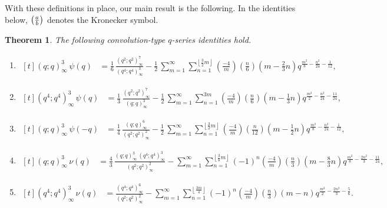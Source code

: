 \documentclass[11pt,reqno]{amsart}
\newtheorem{lthm}{Theorem}
\renewcommand{\=}{\;=\;}
\theoremstyle{myremark}
\begin{document}
With these definitions in place, our main result is the following. 
In the identities below, $\left({a \over b}\right)$ denotes the Kronecker symbol.
\begin{lthm}
\label{thm: main}
The following convolution-type $q$-series identities hold.
\begin{enumerate}[label=\alph*., ref=\alph*, itemsep=1em]
\renewcommand{\labelenumi}{\textup{\alph{enumi}.}}
\item $\displaystyle
\begin{aligned}[t]
(q;q)_\infty^3\,\psi(q)
&=
\frac{1}{6}\,
\frac{(q^2;q^2)_\infty^7}
{(q^4;q^4)_\infty^3} - \frac{1}{2}\,
\sum_{m=1}^\infty
\sum_{n=1}^{\left\lfloor \frac{3}{2}m \right\rfloor}
\left(\frac{-4}{m}\right)
\left(\frac{n}{6}\right)
\left(m-\frac{2}{3}n\right)
q^{\frac{m^2}{8}-\frac{n^2}{24}-\frac{1}{12}},\label{eqn:psi2}
\end{aligned}
$

\item $\displaystyle
\begin{aligned}[t]
(q^4;q^4)_\infty^3\,\psi(q)
&=
\frac{1}{3}\,
\frac{(q^2;q^2)_\infty^7}
{(q;q)_\infty^3}
-\frac{1}{2}\,
\sum_{m=1}^\infty\sum_{n=1}^{3m}\left(\frac{-4}{m}\right)\left(\frac{n}{6}\right)\left(m-\frac{1}{3}n\right)q^{\frac{m^2}{2}-\frac{n^2}{24}-\frac{11}{24}},\label{eqn:psi3}
\end{aligned}
$

\item $\displaystyle
\begin{aligned}[t]
(q;q)_\infty^3\,\psi(-q)
&=
\frac{1}{4}\,
\frac{(q;q)_\infty^6}
{(q^2;q^2)_\infty^2}
-\frac{1}{2}\,
\sum_{m=1}^\infty
\sum_{n=1}^{\left\lfloor \frac{3}{2}m \right\rfloor}
\left(\frac{-4}{m}\right)
\left(\frac{n}{12}\right)
\left(m-\frac{1}{2}n\right)
q^{\frac{m^2}{8}-\frac{n^2}{24}-\frac{1}{12}},\label{eqn:psi5}
\end{aligned}
$

\item $\displaystyle
\begin{aligned}[t]
(q;q)_\infty^3\,\nu(q)
&=
\frac{4}{3}\,
\frac{(q;q)_\infty^3\,(q^4;q^4)_\infty^3}
{(q^2;q^2)_\infty^2}
-\sum_{m=1}^\infty
\sum_{n=1}^{\left\lfloor \frac{3}{8}m \right\rfloor}
(-1)^n
\left(\frac{-4}{m}\right)
\left(\frac{n}{3}\right)
\left(m-\frac{8}{3}n\right)
q^{\frac{m^2}{8}-\frac{2n^2}{3}-\frac{11}{24}},\label{eqn:nu2}
\end{aligned}
$

\item $\displaystyle
\begin{aligned}[t]
(q^4;q^4)_\infty^3\,\nu(q)
&=
\frac{(q^4;q^4)_\infty^6}
{(q^2;q^2)_\infty^2}
-\sum_{m=1}^\infty
\sum_{n=1}^{\left\lfloor \frac{3m}{4} \right\rfloor}
(-1)^{n}
\left(\frac{-4}{m}\right)
\left(\frac{n}{3}\right)
(m-n)
q^{\frac{m^2}{2}-\frac{2n^2}{3}-\frac{5}{6}}.\label{eqn:nu3}
\end{aligned}
$

\end{enumerate}
\end{lthm}
\end{document}
